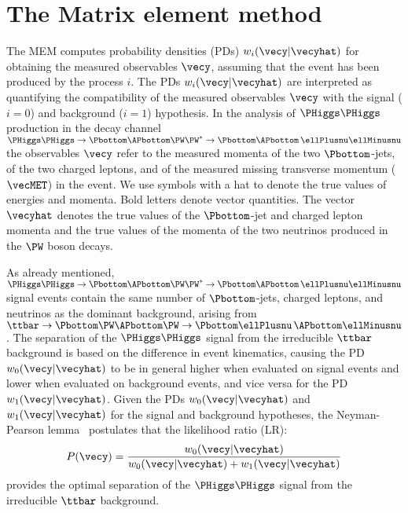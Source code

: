 \section{The Matrix element method}
\label{sec:mem}

The MEM computes probability densities (PDs) $w_{i}(\vecy|\vecyhat)$
for obtaining the measured observables $\vecy$, assuming that the event has been produced by the process $i$.
The PDs $w_{i}(\vecy|\vecyhat)$ are interpreted as quantifying the compatibility of the measured observables $\vecy$
with the signal ($i=0$) and background ($i=1$) hypothesis.
In the analysis of $\PHiggs\PHiggs$ production in the decay channel 
$\PHiggs\PHiggs \to \Pbottom\APbottom\PW\PW^{\ast} \to \Pbottom\APbottom \, \ellPlusnu\ellMinusnu$
the observables $\vecy$ refer to 
the measured momenta of the two $\Pbottom$-jets, of the two charged leptons, and of the measured missing transverse momentum ($\vecMET$) in the event.
We use symbols with a hat to denote the true values of energies and momenta.
Bold letters denote vector quantities.
The vector $\vecyhat$ denotes the true values of the $\Pbottom$-jet and charged lepton momenta and the true values of the momenta of the two neutrinos produced in the $\PW$ boson decays.

As already mentioned, $\PHiggs\PHiggs \to \Pbottom\APbottom\PW\PW^{\ast} \to \Pbottom\APbottom \, \ellPlusnu\ellMinusnu$ signal events
contain the same number of $\Pbottom$-jets, charged leptons, and neutrinos as the dominant background,
arising from $\ttbar \to \Pbottom\PW\APbottom\PW \to \Pbottom\ellPlusnu \, \APbottom\ellMinusnu$.
The separation of the $\PHiggs\PHiggs$ signal from the irreducible $\ttbar$ background is based on the difference in event kinematics,
causing the PD $w_{0}(\vecy|\vecyhat)$ to be in general higher when evaluated on signal events
and lower when evaluated on background events, and vice versa for the PD $w_{1}(\vecy|\vecyhat)$.
Given the PDs $w_{0}(\vecy|\vecyhat)$ and $w_{1}(\vecy|\vecyhat)$ for the signal and background hypotheses,
the Neyman-Pearson lemma~\cite{Neyman:1937uhy} postulates that the likelihood ratio (LR):
\begin{equation}
P(\vecy) = \frac{w_{0}(\vecy|\vecyhat)}{w_{0}(\vecy|\vecyhat) + w_{1}(\vecy|\vecyhat)}
\label{eq:memLR}
\end{equation}
provides the optimal separation of the $\PHiggs\PHiggs$ signal from the irreducible $\ttbar$ background.

